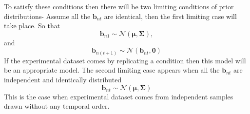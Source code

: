To satisfy these conditions then there will be two limiting conditions of prior distributions- Assume all the $\textbf{b}_{nt}$ are identical, then the first limiting case will take place. So that
\begin{equation} \label{eq:limit_one_a}
   \textbf{b}_{n1} \sim \mathcal{N} ( \boldsymbol{\mu},\boldsymbol{\Sigma}), 
\end{equation}
and
\begin{equation} \label{eq:limit_one_b}
   \textbf{b}_{n(t+1)} \sim \mathcal{N} ( \textbf{b}_{nt},\textbf{0})
\end{equation}
If the experimental dataset comes by replicating a condition then this model will be an appropriate model. The second limiting case appears when all the $\textbf{b}_{nt}$ are independent and identically distributed
\begin{equation} \label{eq:limit_two}
   \textbf{b}_{nt}\sim \mathcal{N} ( \boldsymbol{\mu},\boldsymbol{\Sigma})
\end{equation}
This is the case when experimental dataset comes from independent samples drawn without any temporal order.


